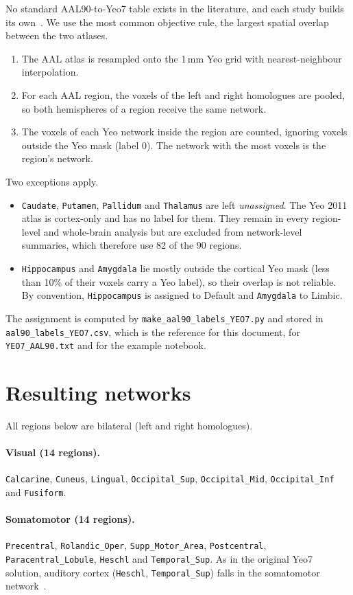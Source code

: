 \documentclass[a4paper,10pt]{article}
\newcommand{\aal}[1]{\texttt{#1}}
\begin{document}
No standard AAL90-to-Yeo7 table exists in the literature, and each study builds its own~\cite{doucet2019}.
We use the most common objective rule, the largest spatial overlap between the two atlases.
\begin{enumerate}
\item The AAL atlas is resampled onto the 1\,mm Yeo grid with nearest-neighbour interpolation.
\item For each AAL region, the voxels of the left and right homologues are pooled, so both hemispheres of a region receive the same network.
\item The voxels of each Yeo network inside the region are counted, ignoring voxels outside the Yeo mask (label 0).
The network with the most voxels is the region's network.
\end{enumerate}
Two exceptions apply.
\begin{itemize}
\item \aal{Caudate}, \aal{Putamen}, \aal{Pallidum} and \aal{Thalamus} are left \emph{unassigned}.
The Yeo 2011 atlas is cortex-only and has no label for them.
They remain in every region-level and whole-brain analysis but are excluded from network-level summaries, which therefore use 82 of the 90 regions.
\item \aal{Hippocampus} and \aal{Amygdala} lie mostly outside the cortical Yeo mask (less than 10\% of their voxels carry a Yeo label), so their overlap is not reliable.
By convention, \aal{Hippocampus} is assigned to Default and \aal{Amygdala} to Limbic.
\end{itemize}
The assignment is computed by \texttt{make\_aal90\_labels\_YEO7.py} and stored in \texttt{aal90\_labels\_YEO7.csv}, which is the reference for this document, for \texttt{YEO7\_AAL90.txt} and for the example notebook.

\section*{Resulting networks}

All regions below are bilateral (left and right homologues).

\paragraph{Visual (14 regions).}
\aal{Calcarine}, \aal{Cuneus}, \aal{Lingual}, \aal{Occipital\_Sup}, \aal{Occipital\_Mid}, \aal{Occipital\_Inf} and \aal{Fusiform}.

\paragraph{Somatomotor (14 regions).}
\aal{Precentral}, \aal{Rolandic\_Oper}, \aal{Supp\_Motor\_Area}, \aal{Postcentral}, \aal{Paracentral\_Lobule}, \aal{Heschl} and \aal{Temporal\_Sup}.
As in the original Yeo7 solution, auditory cortex (\aal{Heschl}, \aal{Temporal\_Sup}) falls in the somatomotor network~\cite{yeo2011}.
\end{document}
